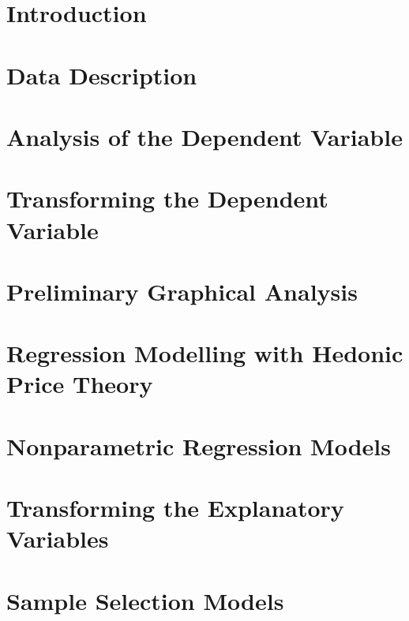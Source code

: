 \documentclass[11pt]{book}
\begin{document}



\pagebreak
\chapter{Introduction}


\pagebreak
\chapter{Data Description}


\pagebreak
\chapter{Analysis of the Dependent Variable}


\pagebreak
\chapter{Transforming the Dependent Variable}


% 

\pagebreak
\chapter{Preliminary Graphical Analysis}


\pagebreak
\chapter{Regression Modelling with Hedonic Price Theory}


\pagebreak
\chapter{Nonparametric Regression Models}


\pagebreak
\chapter{Transforming the Explanatory Variables}


\pagebreak
\chapter{Sample Selection Models}


% 


\end{document}
